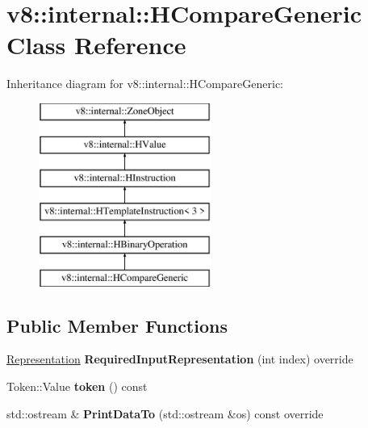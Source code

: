 \hypertarget{classv8_1_1internal_1_1_h_compare_generic}{}\section{v8\+:\+:internal\+:\+:H\+Compare\+Generic Class Reference}
\label{classv8_1_1internal_1_1_h_compare_generic}
Inheritance diagram for v8\+:\+:internal\+:\+:H\+Compare\+Generic\+:\begin{figure}[H]
\begin{center}
\leavevmode
\includegraphics[height=6.000000cm]{classv8_1_1internal_1_1_h_compare_generic}
\end{center}
\end{figure}
\subsection*{Public Member Functions}
\begin{DoxyCompactItemize}
\item 
\hyperlink{classv8_1_1internal_1_1_representation}{Representation} {\bfseries Required\+Input\+Representation} (int index) override\hypertarget{classv8_1_1internal_1_1_h_compare_generic_a67748694ed3bbefcd364ee91abb6fafe}{}\label{classv8_1_1internal_1_1_h_compare_generic_a67748694ed3bbefcd364ee91abb6fafe}

\item 
Token\+::\+Value {\bfseries token} () const \hypertarget{classv8_1_1internal_1_1_h_compare_generic_af50b5b9eef34dead349d6d8a5153cf43}{}\label{classv8_1_1internal_1_1_h_compare_generic_af50b5b9eef34dead349d6d8a5153cf43}

\item 
std\+::ostream \& {\bfseries Print\+Data\+To} (std\+::ostream \&os) const  override\hypertarget{classv8_1_1internal_1_1_h_compare_generic_a5ff76489e47f12456158cf7df764ddc8}{}\label{classv8_1_1internal_1_1_h_compare_generic_a5ff76489e47f12456158cf7df764ddc8}

\end{DoxyCompactItemize}
